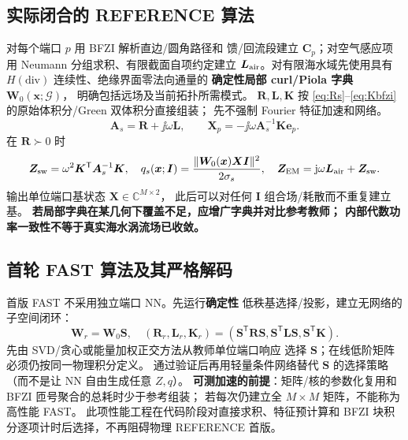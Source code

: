 \subsection{实际闭合的 REFERENCE 算法}
对每个端口 \(p\) 用 BFZI 解析直边/圆角路径和
馈/回流段建立 \(\bm C_p\)；对空气感应项用
Neumann 分组求积、有限截面自项约定建立
\(\bm L_{\rm air}\)。对有限海水域先使用具有
\(H(\mathrm{div})\) 连续性、绝缘界面零法向通量的
\textbf{确定性局部 curl/Piola 字典} \(\bm W_0(\bm x;\mathcal G)\)，
明确包括远场及当前拓扑所需模式。
\(\bm R,\bm L,\bm K\) 按
\eqref{eq:Rs}--\eqref{eq:Kbfzi} 的原始体积分/Green 双体积分直接组装；
先不强制 Fourier 特征加速和网络。
\[
\bm A_s=\bm R+\jj\omega\bm L,\qquad
\bm X_p=-\jj\omega\bm A_s^{-1}\bm K\bm e_p.
\]
在 \(\bm R\succ0\) 时
\[
\bm Z_{\rm sw}=\omega^2\bm K^{\mathsf T}\bm A_s^{-1}\bm K,
\quad
q_s(\bm x;\bm I)
=\frac{\|\bm W_0(\bm x)\bm X\bm I\|^2}{2\sigma_s},
\quad
\bm Z_{\rm EM}=\mathrm j\omega\bm L_{\rm air}+\bm Z_{\rm sw}.
\]
输出单位端口基状态 \(\bm X\in\mathbb C^{M\times2}\)，
此后可以对任何 \(\bm I\) 组合场/耗散而不重复建立基。
\textbf{若局部字典在某几何下覆盖不足，应增广字典并对比参考教师；
内部代数功率一致性不等于真实海水涡流场已收敛。}

\subsection{首轮 FAST 算法及其严格解码}
首版 FAST 不采用独立端口 NN。先运行\textbf{确定性}
低秩基选择/投影，建立无网络的子空间闭环：
\[
\bm W_r=\bm W_0\bm S,\quad
(\bm R_r,\bm L_r,\bm K_r)
=(\bm S^{\mathsf T}\bm R\bm S,
\bm S^{\mathsf T}\bm L\bm S,\bm S^{\mathsf T}\bm K).
\]
先由 SVD/贪心或能量加权正交方法从教师单位端口响应
选择 \(\bm S\)；在线低阶矩阵必须仍按同一物理积分定义。
通过验证后再用轻量条件网络替代 \(\bm S\) 的选择策略
（而不是让 NN 自由生成任意 \(Z,q\)）。
\textbf{可测加速的前提}：矩阵/核的参数化复用和 BFZI
匝号聚合的总耗时少于参考组装；
若每次仍建立全 \(M\times M\) 矩阵，不能称为高性能 FAST。
此项性能工程在代码阶段对直接求积、特征预计算和
BFZI 块积分逐项计时后选择，不再阻碍物理 REFERENCE 首版。

